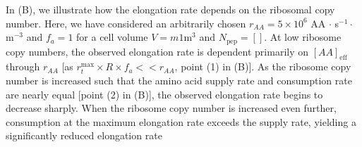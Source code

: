In (B), we illustrate how the elongation rate depends
on the ribosomal copy number. Here, we have considered
an arbitrarily chosen $r_{AA} = 5\times 10^6$ AA $\cdot$ s$^{-1} \cdot$ \textmu
m$^{-3}$ and $f_a = 1$ for a cell volume $V =m 1$\textmu m$^3$ and $N_\text{pep}
= []$. At low ribosome copy numbers, the observed elongation rate is dependent
primarily on $[AA]_\text{eff}$ through $r_{AA}$ [as $r_t^{\text{max}} \times R
\times f_a << r_{AA}$, point (1) in (B)]. As the
ribosome copy number is increased such that the amino acid supply rate and
consumption rate are nearly equal [point (2) in (B)],
the observed elongation rate begins to decrease sharply. When the ribosome copy
number is increased even further, consumption at the maximum elongation rate
exceeds the supply rate, yielding a significantly reduced elongation rate

